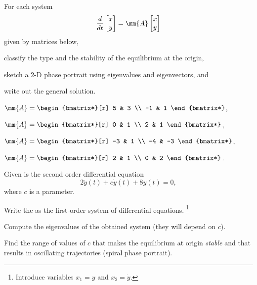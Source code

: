 \begin{question}
For each system
\begin{equation*}
  \frac{d}{dt}
  \begin{bmatrix}
    x \\ y
  \end{bmatrix}
 = \mm{A}   \begin{bmatrix}
    x \\ y
  \end{bmatrix}
\end{equation*}
given by matrices below,
\begin{compactitem}
\item classify the type and the stability of the equilibrium at the origin,
\item sketch a 2-D phase portrait using eigenvalues and eigenvectors, and
\item write out the general solution.
\end{compactitem}

\begin{fullwidth}
\begin{colenumerate}[4]
\item \(\mm{A}=
  \begin{bmatrix*}[r]
    5 & 3 \\ -1 & 1
  \end{bmatrix*}\), %
\item \(\mm{A}=
  \begin{bmatrix*}[r]
      0 & 1 \\ 2 & 1
    \end{bmatrix*}\), %
\item \(\mm{A}=
  \begin{bmatrix*}[r]
      -3 & 1 \\ -4 & -3
    \end{bmatrix*}\), %
\item \(\mm{A}=
  \begin{bmatrix*}[r]
      2 & 1 \\ 0 & 2
    \end{bmatrix*}\). %
\end{colenumerate}
\end{fullwidth}
\end{question}

\begin{question}
  Given is the second order differential equation \[2 \ddot y (t) + c \dot y(t) + 8 y(t) = 0,\] where \(c\) is a parameter.
  \begin{compactenum}[(a)]
  \item Write the \ode{} as the first-order system of differential
    equations. \footnote{Introduce variables \(x_{1} = y\) and \(x_{2} =
      \dot{y}\).}
  \item Compute the eigenvalues of the obtained system (they will depend on \(c\)).
  \item Find the range of values of \(c\) that makes the equilibrium at origin \emph{stable} and that results in oscillating trajectories (spiral phase portrait).
\end{compactenum}
\end{question}
